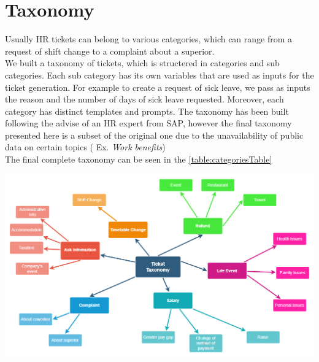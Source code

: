 \section{Taxonomy}
Usually HR tickets can belong to various categories, which can range from a request of shift change to a complaint about a superior. \\
We built a taxonomy of tickets, which is structered in categories and sub categories. Each sub category has its own variables that are used as inputs for the ticket generation. For example to create a request of sick leave, we pass as inputs the reason and the number of days of sick leave requested. Moreover, each category has distinct templates and prompts. The taxonomy has been built following the advise of an HR expert from SAP, however the final taxonomy presented here is a subset of the original one due to the unavailability of public data on certain topics ( Ex. \textit{Work benefits})  \\
The final complete taxonomy can be seen in the \autoref{table:categoriesTable}

\includegraphics[width=\textwidth]{images/Taxonomy_Tickets.drawio}


